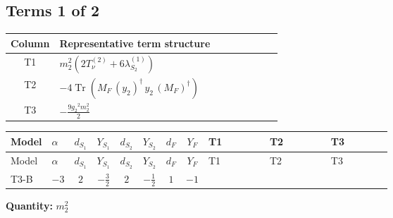 \documentclass[8pt]{article}
\begin{document}
\begin{landscape}
\subsection*{Terms 1 of 2}
\begin{center}
\begin{tabular}{@{}c >{\raggedright\arraybackslash}p{0.82\linewidth}@{}}
\toprule
Column & Representative term structure \\
\midrule
T1 & \(\displaystyle {m_2^2} (2 T_{\nu}^{(2)}+6 {\lambda_{S_2}^{(1)}})\) \\
\midrule
T2 & \(\displaystyle -4 \operatorname{Tr}\!\left({M_F}\,\left({y_2}\right)^{\dagger}\,{y_2}\,\left({M_F}\right)^{\dagger}\right)\) \\
\midrule
T3 & \(\displaystyle -\frac{9 {g_2}^2 {m_2^2}}{2}\) \\
\midrule
\bottomrule
\end{tabular}
\end{center}
\smallskip
\tiny
\begin{longtable}{@{}llcccccc >{\raggedright\arraybackslash}p{0.21\linewidth} >{\raggedright\arraybackslash}p{0.21\linewidth} >{\raggedright\arraybackslash}p{0.21\linewidth}@{}}
\toprule
Model & $\alpha$ & $d_{S_1}$ & $Y_{S_1}$ & $d_{S_2}$ & $Y_{S_2}$ & $d_F$ & $Y_F$ & T1 & T2 & T3 \\
\midrule
\endfirsthead
\toprule
Model & $\alpha$ & $d_{S_1}$ & $Y_{S_1}$ & $d_{S_2}$ & $Y_{S_2}$ & $d_F$ & $Y_F$ & T1 & T2 & T3 \\
\midrule
\endhead
T3-B & $-3$ & $2$ & $-\frac{3}{2}$ & $2$ & $-\frac{1}{2}$ & $1$ & $-1$ & \scriptsize\adjustbox{max width=\linewidth}{$\begin{gathered} {m_2^2} (2 T_{\nu}^{(2)}+6 {\lambda_{S_2}^{(1)}})\end{gathered}$} & \scriptsize\adjustbox{max width=\linewidth}{$\begin{gathered} -4 \operatorname{Tr}\!\left({M_F}\,\left({y_2}\right)^{\dagger}\,{y_2}\,\left({M_F}\right)^{\dagger}\right)\end{gathered}$} & \scriptsize\adjustbox{max width=\linewidth}{$\begin{gathered} -\frac{9 {g_2}^2 {m_2^2}}{2}\end{gathered}$} \\
\midrule
\bottomrule
\end{longtable}
\clearpage
\noindent\textbf{Quantity: }$m_2^2$\par\smallskip

\end{landscape}
\end{document}
